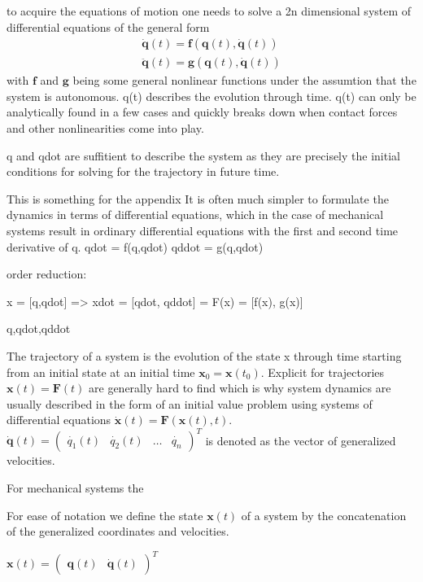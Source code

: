     to acquire the equations of motion one needs to solve a 2n dimensional system of differential equations of the general form 
    \begin{align*}
    \dot{\mathbf{q}}(t) = \mathbf{f}(\mathbf{q}(t),\dot{\mathbf{q}}(t))\\
    \ddot{\mathbf{q}}(t) = \mathbf{g}(\mathbf{q}(t),\dot{\mathbf{q}}(t))
    \end{align*}
    with $\mathbf{f}$ and $\mathbf{g}$ being some general nonlinear functions under the assumtion that the system is autonomous. 
    q(t) describes the evolution through time.
    q(t) can only be analytically found in a few cases and quickly breaks down when contact forces and other nonlinearities come into play. 


    q and qdot are suffitient to describe the system as they are precisely the initial conditions for solving for the trajectory in future time. 


    This is something for the appendix
    It is often much simpler to formulate the dynamics in terms of differential equations, which in the case of mechanical systems result in ordinary differential equations with the first and second time derivative of q. 
    qdot = f(q,qdot)
    qddot = g(q,qdot)

    order reduction:

    x = [q,qdot] => xdot = [qdot, qddot] = F(x) = [f(x), g(x)]


    q,qdot,qddot 



    The trajectory of a system is the evolution of the state x through time starting from an initial state at an initial time $\mathbf{x}_0 = \mathbf{x}(t_0)$. Explicit for trajectories $\mathbf{x}(t) = \mathbf{F}(t)$ are generally hard to find which is why system dynamics are usually described in the form of an initial value problem using systems of differential equations $\dot{\mathbf{x}}(t) = \mathbf{F}(\mathbf{x}(t),t)$. $\dot{\mathbf{q}}(t) = \begin{pmatrix}\dot{q_1}(t)&\dot{q_2}(t)&\ldots&\dot{q_n}\end{pmatrix}^T$ is denoted as the vector of generalized velocities. 

    For mechanical systems the 


    For ease of notation we define the state $\mathbf{x}(t)$ of a system by the concatenation of the generalized coordinates and velocities.

    $\mathbf{x}(t) = \begin{pmatrix}\mathbf{q}(t)&\dot{\mathbf{q}}(t)\end{pmatrix}^T$



